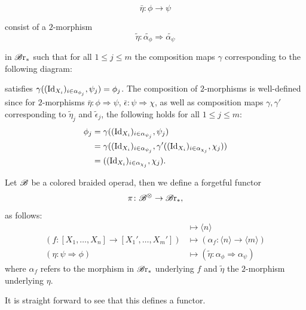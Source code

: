 \begin{defin}
\begin{enumerate}[(i)]
        $$\bar{\eta} \colon \phi \to \psi$$

        consist of
        a $2$-morphism 
        $$\widetilde{\eta} \colon \widetilde{\alpha_{\phi}} \Rightarrow \widetilde{\alpha_{\psi}}$$

        in $\mathscr{B} \text{r}_{\ast}$ such that for all $1 \leq j \leq m$ the composition maps $\gamma$ corresponding to the
        following diagram:
        \begin{center}
        \end{center}
        satisfies $\gamma((\operatorname{Id}_{X_i})_{i \in \alpha_{\phi_j}}, \psi_j) =
        \phi_j$. The composition of $2$-morphisms is well-defined since for
        $2$-morphisms $\bar{\eta} \colon \phi \Rightarrow \psi$, $\bar{\epsilon} \colon \psi \Rightarrow
        \chi$, as well as composition maps $\gamma, \gamma'$ corresponding to
        $\widetilde{\eta}_j$ and $\widetilde{\epsilon}_j$, the following holds for all $1 \leq j \leq
        m$:
        \begin{align*}
            \phi_j &= \gamma ((\operatorname{Id}_{X_i})_{i \in \alpha_{\psi_j}}, \psi_j) \\
            &= \gamma((\operatorname{Id}_{X_i})_{i \in \alpha_{\psi_j}}, \gamma'((\operatorname{Id}_{X_i})_{i \in \alpha_{\chi_j}}, \chi_j)) \\
            &= ((\operatorname{Id}_{X_i})_{i \in \alpha_{\chi_j}}, \chi_j).
        \end{align*}

    \end{enumerate}
\end{defin}

\begin{defin}
Let $\mathscr{B}$ be a colored braided operad, then we define a forgetful functor
\[
    \pi \colon \mathscr{B}^{\otimes} \to \mathscr{B} \text{r}_{\ast},
\]
as follows:
\begin{align*}
    [X_1, \dots, X_n] &\mapsto \langle n \rangle \\
    (f \colon [X_1, \dots, X_n] \to [X_1', \dots, X_m']) &\mapsto (\alpha_f \colon \langle n \rangle \to \langle m \rangle) \\
    (\eta \colon \psi \Rightarrow \phi) &\mapsto (\widetilde{\eta} \colon \alpha_{\phi} \Rightarrow \alpha_{\psi})
\end{align*}
where $\alpha_f$ refers to the morphism in $\mathscr{B} \text{r}_{\ast}$ underlying $f$ and $\widetilde{\eta}$ the $2$-morphism underlying $\eta$. 
\end{defin}
It is straight
forward to see that this defines a functor.

